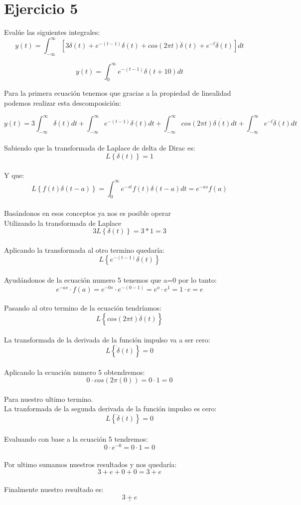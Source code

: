 \documentclass[10pt,a4paper]{report}
\begin{document}
\section{Ejercicio 5}

Evalúe las siguientes integrales:
\[
y(t)=\int_{-\infty }^{\infty }[3\delta (t)+e^{-(t-1)}\delta (t)+cos(2\pi t)\dot{\delta} (t)+e^{-t}\ddot{\delta }(t) ]dt
\]

\[
y(t)=\int_{0}^{\infty }e^{-(t-1)}\delta (t+10)dt
\]

Para la primera ecuación tenemos que gracias a la propiedad de linealidad podemos realizar esta descomposición:

\[
y(t)=3\int_{-\infty }^{\infty }\delta (t)dt+\int_{-\infty }^{\infty }e^{-(t-1)}\delta (t)dt+\int_{-\infty }^{\infty }cos(2\pi t)\dot{\delta (t)}dt+\int_{-\infty }^{\infty }e^{-t}\ddot{\delta}(t)dt
\]\\
Sabiendo que la transformada de Laplace de delta de Dirac es:
\[
L\left \{ \delta \left ( t \right ) \right \}=1
\]\\
Y que:
\[
L\left \{ f(t)\delta (t-a) \right \}=\int_{0 }^{\infty }e^{-st}f(t)\delta (t-a)dt=e^{-as}f(a)
\]\\
Basándonos en esos conceptos ya nos es posible operar\\
Utilizando la transformada de Laplace
\[
3L\left \{ \delta (t) \right \}=3\ast 1=3
\]\\
Aplicando la transformada al otro termino quedaría:
\[
L\left \{ e^{-(t-1)}\delta (t) \right \}
\]\\
Ayudándonos de la ecuación numero 5 tenemos que a=0 por lo tanto:\\
\[
e^{-as}\cdot f(a)=e^{-0s}\cdot e^{-(0-1)}=e^{o}\cdot e^{1}=1\cdot e=e
\]\\

Pasando al otro termino de la ecuación tendríamos:
\[
L\left \{ cos(2\pi t)\dot{\delta }(t) \right \}
\]\\
La transformada de la derivada de la función impulso va a ser cero:
\[
L\left \{ \dot{\delta }(t) \right \}=0
\]\\
Aplicando la ecuación numero 5 obtendremos:
\[
0\cdot cos(2\pi (0))=0\cdot 1=0
\]\\
Para nuestro ultimo termino.\\
La tranformada de la segunda derivada de la función impulso es cero:
\[
L\left \{ \ddot{\delta }(t) \right \}=0
\]\\
Evaluando con base a la ecuación 5 tendremos:
\[
0\cdot e^{-0}=0\cdot 1=0
\]\\
Por ultimo sumamos nuestros resultados y nos quedaría:
\[
3+e+0+0=3+e
\]\\
Finalmente nuestro resultado es:
\[
\underline{3+e}
\]\\
\end{document}
